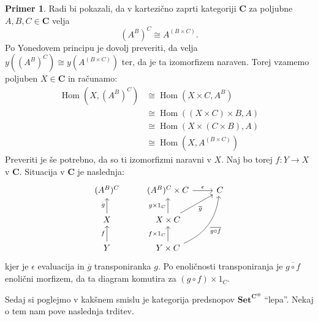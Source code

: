 \documentclass[12pt,a4paper]{book}
\theoremstyle{definition}
\theoremstyle{plain}
\theoremstyle{definition}
\newtheorem{primer}{Primer}[section]
\theoremstyle{remark}
\newcommand{\cat}[1]{\textbf{#1}}
\DeclareMathOperator{\Hom}{Hom}
\newcommand{\predsnop}[1]{\cat{Set}^{\cat{#1}^{op}}}
\begin{document}
\begin{primer}
Radi bi pokazali, da v kartezično zaprti kategoriji $\cat{C}$ za poljubne $A,B,C \in \cat{C}$ velja 
$$(A^B)^C \cong A^{(B \times C)}.$$
Po Yonedovem principu je dovolj preveriti, da velja $y((A^B)^C) \cong y(A^{(B \times C)})$ ter, da je ta izomorfizem naraven. Torej vzamemo poljuben $X \in \cat{C}$ in računamo:
\begin{align*}
\Hom(X, (A^B)^C) &\cong \Hom(X \times C, A^B) \\
&\cong \Hom((X \times C) \times B, A) \\
&\cong \Hom(X \times (C \times B), A) \\
&\cong \Hom(X, A^{(B \times C)})
\end{align*}
Preveriti je še potrebno, da so ti izomorfizmi naravni v $X$.
Naj bo torej $f : Y \to X$ v $ \cat{C}$. Situacija v $\cat{C}$ je naslednja:
%
\begin{equation}
\begin{tikzcd}
(A^B)^C & (A^B)^C \times C \ar[r, "\epsilon"] & C \\
X \ar[u, "g"] & X \times C \ar[u, "g \times 1_C"] \ar[ur, "\overline{g}"'] & \\
Y \ar[u, "f"] & Y \times C \ar[u, "f \times 1_C"] \ar[uur, bend right, "\overline{g \circ f}"'] &
\end{tikzcd}
\end{equation}
kjer je $\epsilon$ evaluacija in $\overline{g}$ transponiranka $g$. Po enoličnosti transponiranja je $\overline{g \circ f}$ enolični morfizem, da ta diagram komutira za $(g \circ f) \times 1_C$.

\end{primer}


Sedaj si poglejmo v kakšnem smislu je kategorija predsnopov $\predsnop{C}$ "`lepa"'. Nekaj o tem nam pove naslednja trditev.
\end{document}
